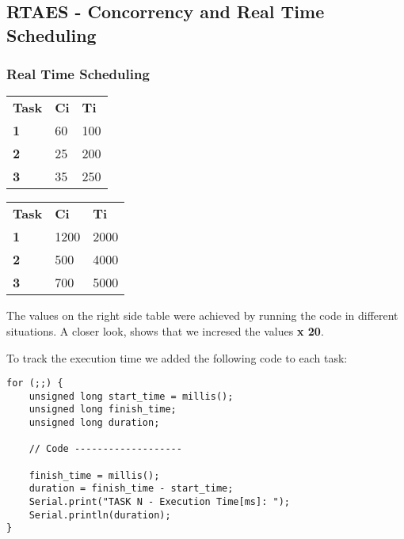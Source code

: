 \documentclass[11pt]{article}
\begin{document}
\subsection{RTAES - Concorrency and Real Time Scheduling}

\subsubsection{Real Time Scheduling}

\begin{table}[!htb]
    \caption{Theoretical values (left) and implemented values (right) in \textit{ms}:}
    \begin{minipage}{0.7\linewidth}
		\begin{table}[H]
		\begin{tabular}{lll}
		\textbf{Task} & \textbf{Ci} & \textbf{Ti} \\
		\textbf{1}    & 60         & 100           \\
		\textbf{2}    & 25         & 200           \\
		\textbf{3}    & 35         & 250          
		\end{tabular}
		\label{table:rt-1}
		\end{table}

    \end{minipage}%
    \begin{minipage}{.5\linewidth}
		\begin{table}[H]
		\begin{tabular}{lll}
		\textbf{Task} & \textbf{Ci} & \textbf{Ti} \\
		\textbf{1}    & 1200         & 2000           \\
		\textbf{2}    & 500         & 4000           \\
		\textbf{3}    & 700         & 5000          
		\end{tabular}
		\label{table:rt-2}
		\end{table}

    \end{minipage} 
\end{table}

The values on the right side table were achieved by running the code in different situations. A closer look, shows that we incresed the values \textbf{x 20}.

To track the execution time we added the following code to each task:

\begin{verbatim}
for (;;) {
    unsigned long start_time = millis();
    unsigned long finish_time;
    unsigned long duration;

    // Code -------------------

    finish_time = millis();      
    duration = finish_time - start_time;
    Serial.print("TASK N - Execution Time[ms]: ");
    Serial.println(duration); 
}
\end{verbatim}
\end{document}
